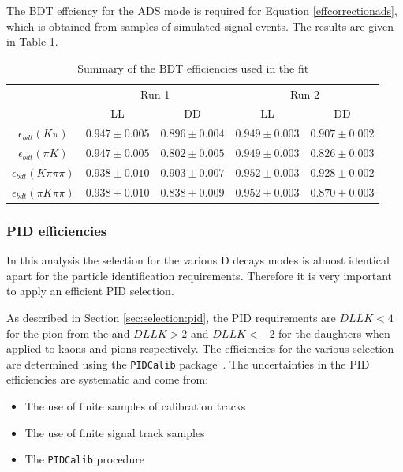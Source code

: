 The BDT effciency for the ADS mode is required for Equation \ref{effcorrectionads}, which is obtained from samples of simulated signal events. The results are given in Table \ref{bdteff}.

\begin{table}[h]
\centering
\begin{tabular}{c|cc|cc}
\hline
& \multicolumn{2}{c}{Run 1} & \multicolumn{2}{c}{Run 2} \\
& LL & DD & LL & DD \\
\hline
$\epsilon_{bdt}(K\pi)$ & $0.947 \pm 0.005$ & $0.896 \pm 0.004$ & $0.949 \pm 0.003$ & $0.907 \pm 0.002$ \\
$\epsilon_{bdt}(\pi K)$ & $0.947 \pm 0.005$ & $0.802 \pm 0.005$ & $0.949 \pm 0.003$ & $0.826 \pm 0.003$ \\
$\epsilon_{bdt}(K\pi\pi\pi)$ & $0.938 \pm 0.010$ & $0.903 \pm 0.007$ & $0.952 \pm 0.003$ & $0.928 \pm 0.002$ \\
$\epsilon_{bdt}(\pi K\pi\pi)$ & $0.938 \pm 0.010$ & $0.838 \pm 0.009$ & $0.952 \pm 0.003$ & $0.870 \pm 0.003$ \\
\hline
\end{tabular}
\caption{Summary of the BDT efficiencies used in the \CP fit}
\label{bdteff}
\end{table}


\subsubsection{PID efficiencies}
\label{sec:cpfit:efficiencies:pid}

In this analysis the selection for the various D decays modes \decay{\D}{\kaon\pi, \kaon\kaon, \pi\pi, \pi\kaon} is almost identical apart for the particle identification requirements. Therefore it is very important to apply an efficient PID selection.

As described in Section \ref{sec:selection:pid}, the PID requirements are $DLLK < 4$ for the pion from the \Kstarm and $DLLK > 2$ and $DLLK < -2$ for the \D daughters when applied to kaons and pions respectively. The efficiencies for the various selection are determined using the {\tt PIDCalib} package~\cite{PIDCalib}. The uncertainties in the PID efficiencies are systematic and come from:


\begin{itemize}
\item The use of finite samples of \Dstar calibration tracks
\item The use of finite signal track samples
\item The {\tt PIDCalib} procedure
\end{itemize}

